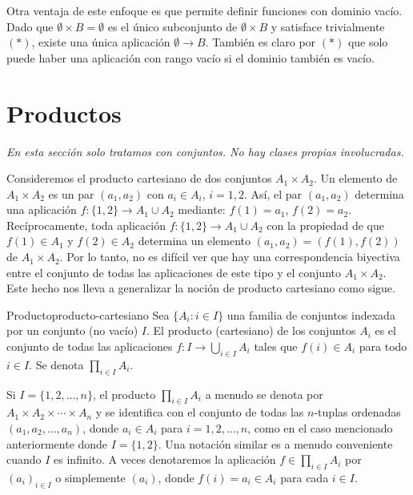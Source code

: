 Otra ventaja de este enfoque es que permite definir funciones con dominio vacío. Dado que \( \emptyset \times B = \emptyset \) es el único subconjunto de \( \emptyset \times B \) y satisface trivialmente $(*)$, existe una única aplicación \( \emptyset \to B \). También es claro por $(*)$ que solo puede haber una aplicación con rango vacío si el dominio también es vacío.

\clearpage
\section{Productos}

\textit{En esta sección solo tratamos con conjuntos. No hay clases propias involucradas.}
\vspace{0.5cm}

Consideremos el producto cartesiano de dos conjuntos \( A_1 \times A_2 \). Un elemento de \( A_1 \times A_2 \) es un par \( (a_1, a_2) \) con \( a_i \in A_i \), \( i = 1, 2 \). Así, el par \( (a_1, a_2) \) determina una aplicación \( f: \{1, 2\} \to A_1 \cup A_2 \) mediante: \( f(1) = a_1 \), \( f(2) = a_2 \). Recíprocamente, toda aplicación \( f: \{1, 2\} \to A_1 \cup A_2 \) con la propiedad de que \( f(1) \in A_1 \) y \( f(2) \in A_2 \) determina un elemento \( (a_1, a_2) = (f(1), f(2)) \) de \( A_1 \times A_2 \). Por lo tanto, no es difícil ver que hay una correspondencia biyectiva entre el conjunto de todas las aplicaciones de este tipo y el conjunto \( A_1 \times A_2 \). Este hecho nos lleva a generalizar la noción de producto cartesiano como sigue.

\begin{definition}{Producto}{producto-cartesiano}
    Sea \( \{A_i : i \in I\} \) una familia de conjuntos indexada por un conjunto (no vacío) \( I \). El producto (cartesiano) de los conjuntos \( A_i \) es el conjunto de todas las aplicaciones \( f: I \to \bigcup_{i \in I} A_i \) tales que \( f(i) \in A_i \) para todo \( i \in I \). Se denota \( \prod_{i \in I} A_i \).
\end{definition}

Si \( I = \{1, 2, \ldots, n\} \), el producto \( \prod_{i \in I} A_i \) a menudo se denota por \( A_1 \times A_2 \times \cdots \times A_n \) y se identifica con el conjunto de todas las \( n \)-tuplas ordenadas \( (a_1, a_2, \ldots, a_n) \), donde \( a_i \in A_i \) para $i = 1, 2, \ldots, n$, como en el caso mencionado anteriormente donde $I = \{1, 2\}$. Una notación similar es a menudo conveniente cuando $I$ es infinito. A veces denotaremos la aplicación $f \in \prod_{i \in I} A_i$ por $(a_i)_{i \in I}$ o simplemente $(a_i)$, donde $f(i) = a_i \in A_i$ para cada $i \in I$.


